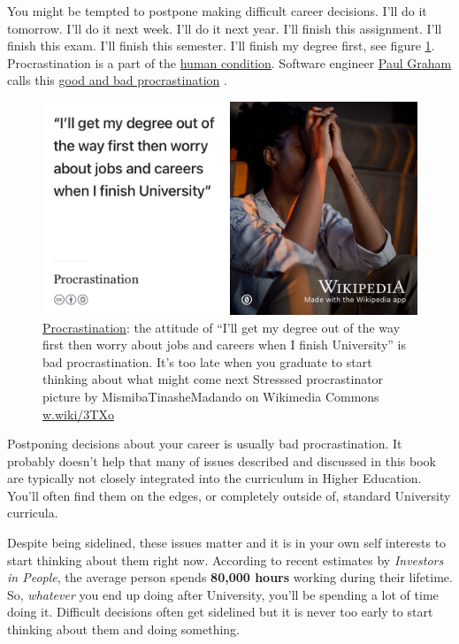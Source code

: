 \documentclass[
]{book}
\begin{document}
You might be tempted to postpone making difficult career decisions. I'll do it tomorrow. I'll do it next week. I'll do it next year. I'll finish this assignment. I'll finish this exam. I'll finish this semester. I'll finish my degree first, see figure \ref{fig:procrastination-fig}. Procrastination is a part of the \href{https://en.wikipedia.org/wiki/Human_condition}{human condition}. Software engineer \href{https://en.wikipedia.org/wiki/Paul_Graham_(programmer)}{Paul Graham} calls this \href{http://paulgraham.com/procrastination.html}{good and bad procrastination} \citep{procrastination}.

\begin{figure}

{\centering \includegraphics[width=0.99\linewidth]{images/procrastinator} 

}

\caption{\href{https://en.wikipedia.org/wiki/Procrastination}{Procrastination}: the attitude of ``I'll get my degree out of the way first then worry about jobs and careers when I finish University'' is bad procrastination. It's too late when you graduate to start thinking about what might come next \citep{procrastination} Stresssed procrastinator picture by MismibaTinasheMadando on Wikimedia Commons \href{https://w.wiki/3TXo}{w.wiki/3TXo}}\label{fig:procrastination-fig}
\end{figure}



Postponing decisions about your career is usually bad procrastination. It probably doesn't help that many of issues described and discussed in this book are typically not closely integrated into the curriculum in Higher Education. You'll often find them on the edges, or completely outside of, standard University curricula.

Despite being sidelined, these issues matter and it is in your own self interests to start thinking about them right now. According to recent estimates by \emph{Investors in People}, the average person spends \textbf{80,000 hours} working during their lifetime. \citep{iip2} So, \emph{whatever} you end up doing after University, you'll be spending a lot of time doing it. Difficult decisions often get sidelined but it is never too early to start thinking about them and doing something.
\end{document}
